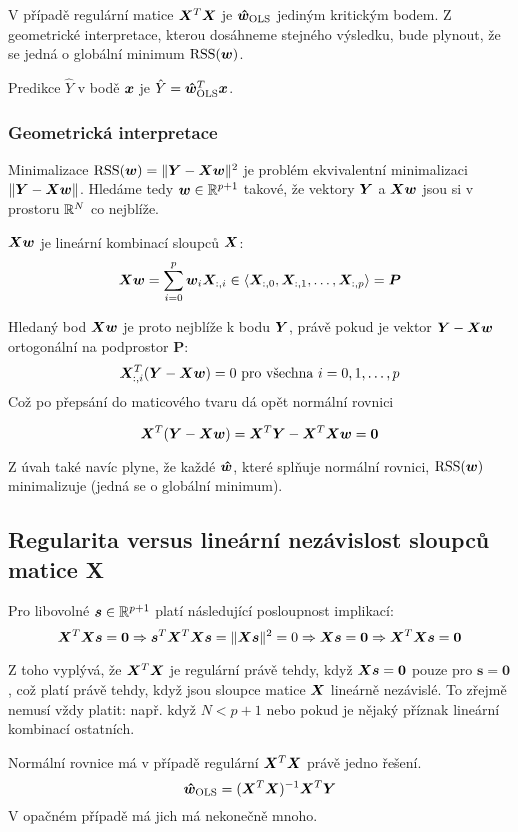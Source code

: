 V případě regulární matice $\bm{X}^T\bm{X}$ je $\bm{\hat{w}}_{\text{OLS}}$ jediným kritickým bodem. Z geometrické interpretace, kterou dosáhneme stejného výsledku, bude plynout, že se jedná o globální minimum $\operatorname{RSS}(\bm{w})$.

Predikce $\hat{Y}$ v bodě $\bm{x}$ je $\hat{Y} = \bm{\hat{w}}_{\text{OLS}}^T \bm{x}$.

\subsubsection{Geometrická interpretace}

Minimalizace $\operatorname{RSS}(\bm{w}) = \| \bm{Y} - \bm{X} \bm{w} \|^2$ je problém ekvivalentní minimalizaci ${\| \bm{Y} - \bm{X} \bm{w} \|}$. Hledáme tedy $\bm{w} \in \mathbb{R}^{p+1}$ takové, že vektory $\bm{Y}$ a $\bm{X}\bm{w}$ jsou si v prostoru $\mathbb{R}^{N}$ co nejblíže.

$\bm{X}\bm{w}$ je lineární kombinací sloupců $\bm{X}$:
\[ \bm{X}\bm{w} = \sum_{i=0}^{p} \bm{w}_i \bm{X}_{:,i} \in \langle \bm{X}_{:,0}, \bm{X}_{:,1}, \ldots, \bm{X}_{:,p} \rangle = \bm{P} \]

Hledaný bod $\bm{X}\bm{w}$ je proto nejblíže k bodu $\bm{Y}$, právě pokud je vektor $\bm{Y} - \bm{X}\bm{w}$ ortogonální na podprostor $\bm{P}$:
\[ \bm{X}_{:,i}^T(\bm{Y} - \bm{X}\bm{w}) = 0 \text{ pro všechna } i = 0, 1, \ldots, p \]
Což po přepsání do maticového tvaru dá opět normální rovnici

\[ \bm{X}^T(\bm{Y} - \bm{X}\bm{w}) = \bm{X}^T\bm{Y} - \bm{X}^T\bm{X}\bm{w} = \bm{0} \]

Z úvah také navíc plyne, že každé $\bm{\hat{w}}$, které splňuje normální rovnici, $\operatorname{RSS}(\bm{w})$ minimalizuje (jedná se o globální minimum).

\subsection{Regularita versus lineární nezávislost sloupců matice X}

Pro libovolné $\bm{s} \in \mathbb{R}^{p+1}$ platí následující posloupnost implikací:
\[
    \bm{X}^T\bm{X}\bm{s} = \mathbf{0}
    \Rightarrow \bm{s}^T\bm{X}^T\bm{X}\bm{s} = \|\bm{X}\bm{s}\|^2 = 0
    \Rightarrow \bm{X}\bm{s} = \bm{0}
    \Rightarrow \bm{X}^T\bm{X}\bm{s} = \mathbf{0}
\]

Z toho vyplývá, že $\bm{X}^T\bm{X}$ je regulární právě tehdy, když $\bm{X}\bm{s} = \bm{0}$ pouze pro $\bm{s} = \bm{0}$, což platí právě tehdy, když jsou sloupce matice $\bm{X}$ lineárně nezávislé. To zřejmě nemusí vždy platit: např. když $N < p+1$ nebo pokud je nějaký příznak lineární kombinací ostatních.

Normální rovnice má v případě regulární $\bm{X}^T \bm{X}$ právě jedno řešení.
\[ \bm{\hat{w}}_{\text{OLS}} = (\bm{X}^T \bm{X})^{-1} \bm{X}^T \bm{Y} \]
V opačném případě má jich má nekonečně mnoho.

